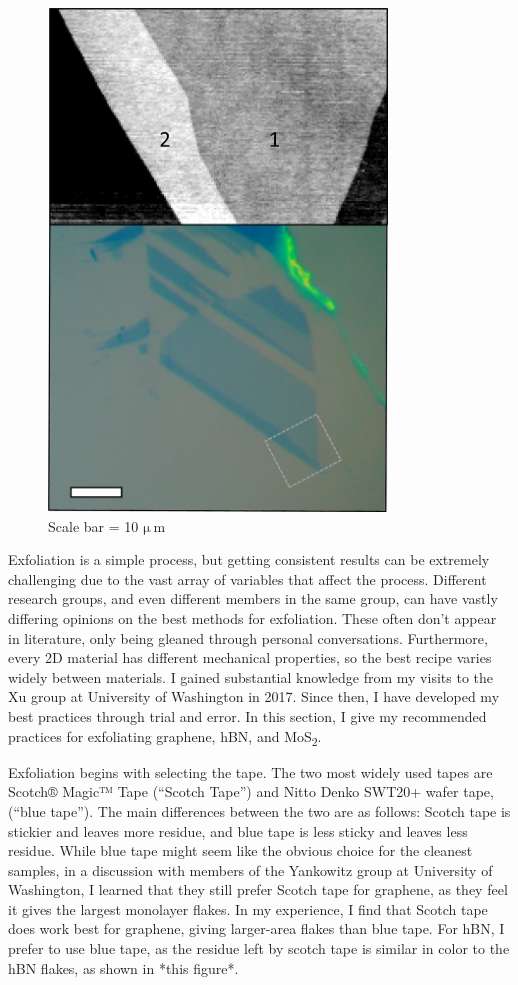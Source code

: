 \documentclass[double,12pt,1in]{beavtex}
\begin{document}
\begin{figure}[ht!]
    \centering
    \includegraphics[width = 9cm]{graphene layer comparison.png}
    \caption{Scale bar = 10 $\mathrm{\mu\ m}$}
    \label{fig:graphenelayer}
    
\end{figure}

Exfoliation is a simple process, but getting consistent results can be extremely challenging due to the vast array of variables that affect the process. Different research groups, and even different members in the same group, can have vastly differing opinions on the best methods for exfoliation. These often don’t appear in literature, only being gleaned through personal conversations. Furthermore, every 2D material has different mechanical properties, so the best recipe varies widely between materials. I gained substantial knowledge from my visits to the Xu group at University of Washington in 2017. Since then, I have developed my best practices through trial and error. In this section, I give my recommended practices for exfoliating graphene, hBN, and MoS\textsubscript{2}.

Exfoliation begins with selecting the tape. The two most widely used tapes are Scotch® Magic™ Tape (“Scotch Tape”) and Nitto Denko SWT20+ wafer tape, (“blue tape”). The main differences between the two are as follows: Scotch tape is stickier and leaves more residue, and blue tape is less sticky and leaves less residue. While blue tape might seem like the obvious choice for the cleanest samples, in a discussion with members of the Yankowitz group at University of Washington, I learned that they still prefer Scotch tape for graphene, as they feel it gives the largest monolayer flakes. In my experience, I find that Scotch tape does work best for graphene, giving larger-area flakes than blue tape. For hBN, I prefer to use blue tape, as the residue left by scotch tape is similar in color to the hBN flakes, as shown in *this figure*.
\end{document}
